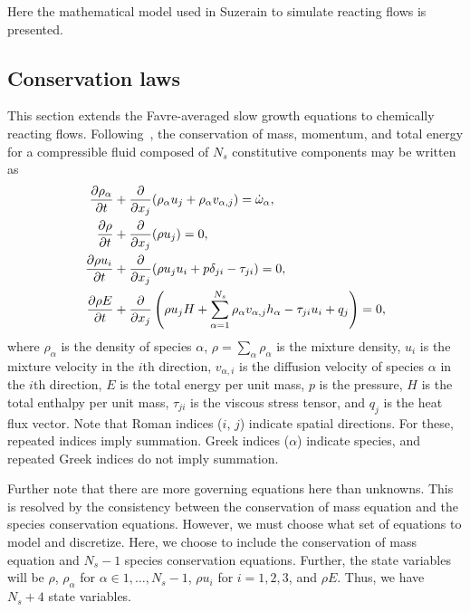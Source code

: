 \label{sec:derivation}

Here the mathematical model used in Suzerain to simulate reacting flows is
presented.

\subsection{Conservation laws}

This section extends the Favre-averaged slow growth equations to
chemically reacting flows.  Following~\cite{Anderson_hypersonics,
  Kirk_2009_FINS_model_doc,
  Topalian_2011_temporal_slow_growth_reacting}, the conservation of
mass, momentum, and total energy for a compressible fluid composed of
$N_s$ constitutive components may be written as
%
\begin{align*}
  \frac{\partial \rho_{\alpha}}{\partial t} & + \frac{\partial }{\partial x_j} (\rho_{\alpha} u_j + \rho_{\alpha} v_{\alpha, j}) = \dot{\omega}_{\alpha}, \\
  \frac{\partial \rho}{\partial t} & + \frac{\partial }{\partial x_j} (\rho u_j) = 0, \\
  \frac{\partial \rho u_i}{\partial t} & + \frac{\partial }{\partial x_j} (\rho u_j u_i + p \delta_{ji} - \tau_{ji}) = 0, \\
  \frac{\partial \rho E}{\partial t} & + \frac{\partial }{\partial x_j} \left(\rho u_j H + \sum_{\alpha=1}^{N_s} \rho_{\alpha} v_{\alpha, j} h_{\alpha}  - \tau_{ji} u_i + q_j \right) = 0,\\
\end{align*}
% 
where $\rho_{\alpha}$ is the density of species $\alpha$, $\rho=\sum_{\alpha} \rho_{\alpha}$
is the mixture density, $u_i$ is the mixture velocity in the $i$th
direction, $v_{\alpha, i}$ is the diffusion velocity of species $\alpha$ in the
$i$th direction, $E$ is the total energy per unit mass, $p$ is the
pressure, $H$ is the total enthalpy per unit mass, $\tau_{ji}$ is the
viscous stress tensor, and $q_j$ is the heat flux vector.  Note that
Roman indices ($i$, $j$) indicate spatial directions.  For these,
repeated indices imply summation.  Greek indices ($\alpha$) indicate
species, and repeated Greek indices do not imply summation.

Further note that there are more governing equations here than
unknowns.  This is resolved by the consistency between the
conservation of mass equation and the species conservation equations.
However, we must choose what set of equations to model and discretize.
Here, we choose to include the conservation of mass equation and $N_s
-1$ species conservation equations.  Further, the state variables will
be $\rho$, $\rho_{\alpha}$ for $\alpha \in 1, \ldots, N_s -1$, $\rho
u_i$ for $i = 1, 2, 3$, and $\rho E$.  Thus, we have $N_s + 4$ state
variables.

